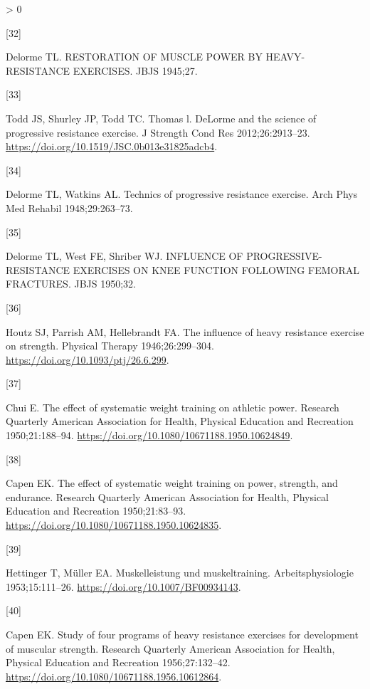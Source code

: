 \documentclass[twoside,10pt]{gihclass} %
\newlength{\cslhangindent}
\newlength{\csllabelwidth}
\newenvironment{CSLReferences}[3] %
 {%
  \setlength{\parindent}{0pt}
  \ifodd #1 \everypar{\setlength{\hangindent}{\cslhangindent}}\ignorespaces\fi
  \ifnum #2 > 0
  \setlength{\parskip}{#2\baselineskip}
  \fi
 }%
 {}
\newcommand{\CSLLeftMargin}[1]{\parbox[t]{\maxof{\widthof{#1}}{\csllabelwidth}}{#1}}
\newcommand{\CSLRightInline}[1]{\parbox[t]{\linewidth}{#1}}
\begin{document}
\begin{CSLReferences}{0}{0}
\leavevmode\hypertarget{ref-RN2633}{}%
\CSLLeftMargin{{[}32{]} }
\CSLRightInline{Delorme TL. RESTORATION OF MUSCLE POWER BY HEAVY-RESISTANCE EXERCISES. JBJS 1945;27.}

\leavevmode\hypertarget{ref-RN2639}{}%
\CSLLeftMargin{{[}33{]} }
\CSLRightInline{Todd JS, Shurley JP, Todd TC. Thomas l. DeLorme and the science of progressive resistance exercise. J Strength Cond Res 2012;26:2913--23. \url{https://doi.org/10.1519/JSC.0b013e31825adcb4}.}

\leavevmode\hypertarget{ref-RN2641}{}%
\CSLLeftMargin{{[}34{]} }
\CSLRightInline{Delorme TL, Watkins AL. Technics of progressive resistance exercise. Arch Phys Med Rehabil 1948;29:263--73.}

\leavevmode\hypertarget{ref-RN2646}{}%
\CSLLeftMargin{{[}35{]} }
\CSLRightInline{Delorme TL, West FE, Shriber WJ. INFLUENCE OF PROGRESSIVE-RESISTANCE EXERCISES ON KNEE FUNCTION FOLLOWING FEMORAL FRACTURES. JBJS 1950;32.}

\leavevmode\hypertarget{ref-RN2632}{}%
\CSLLeftMargin{{[}36{]} }
\CSLRightInline{Houtz SJ, Parrish AM, Hellebrandt FA. The influence of heavy resistance exercise on strength. Physical Therapy 1946;26:299--304. \url{https://doi.org/10.1093/ptj/26.6.299}.}

\leavevmode\hypertarget{ref-RN2644}{}%
\CSLLeftMargin{{[}37{]} }
\CSLRightInline{Chui E. The effect of systematic weight training on athletic power. Research Quarterly American Association for Health, Physical Education and Recreation 1950;21:188--94. \url{https://doi.org/10.1080/10671188.1950.10624849}.}

\leavevmode\hypertarget{ref-RN2642}{}%
\CSLLeftMargin{{[}38{]} }
\CSLRightInline{Capen EK. The effect of systematic weight training on power, strength, and endurance. Research Quarterly American Association for Health, Physical Education and Recreation 1950;21:83--93. \url{https://doi.org/10.1080/10671188.1950.10624835}.}

\leavevmode\hypertarget{ref-RN2645}{}%
\CSLLeftMargin{{[}39{]} }
\CSLRightInline{Hettinger T, Müller EA. Muskelleistung und muskeltraining. Arbeitsphysiologie 1953;15:111--26. \url{https://doi.org/10.1007/BF00934143}.}

\leavevmode\hypertarget{ref-RN1477}{}%
\CSLLeftMargin{{[}40{]} }
\CSLRightInline{Capen EK. Study of four programs of heavy resistance exercises for development of muscular strength. Research Quarterly American Association for Health, Physical Education and Recreation 1956;27:132--42. \url{https://doi.org/10.1080/10671188.1956.10612864}.}


\end{CSLReferences}
\end{document}
